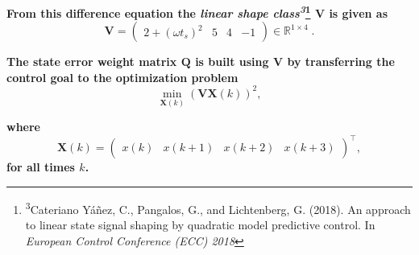 \documentclass[a0paper,portrait]{baposter}
\begin{document}
\begin{poster}
{\vspace{.5em}
\textbf{From this difference equation the \textit{linear shape class\textsuperscript{3}}{\renewcommand*\@makefnmark{}\footnote{\textsuperscript{3}Cateriano Y\'a\~nez, C., Pangalos, G., and Lichtenberg, G. (2018). An approach to linear state signal shaping by quadratic model predictive control. In \textit{European Control Conference (ECC) 2018 \vspace{-.4em}}}\makeatother} $\mathbf{V}$ is given as}
\begin{equation*}
\mathbf{V} = 
\left( \begin{array}{cccc} 
2+(\omega t_s)^2 & 5 & 4 & - 1
\end{array} \right)\in \mathbb{R}^{1 \times 4} \; .
\end{equation*}

\textbf{The state error weight matrix $\mathbf{Q}$ is built using $\mathbf{V}$ by transferring the control goal to the optimization problem}
\vspace{-.2em}
\begin{equation*}
\min_{\mathbf{X}(k)} \left( \mathbf{V}\mathbf{X}(k) \right)^2,
\end{equation*}

\vspace{-.7em}
\textbf{where}
\small
\begin{equation*} 
\mathbf{X}(k) =  \left(\begin{array}{cccc} x(k) & x(k+1) & x(k+2) & x(k+3) \end{array} \right)^\intercal\!,
\end{equation*}
\normalsize
\textbf{for all times $k$.}

\vspace{.56em}
}



\end{poster}
\end{document}
